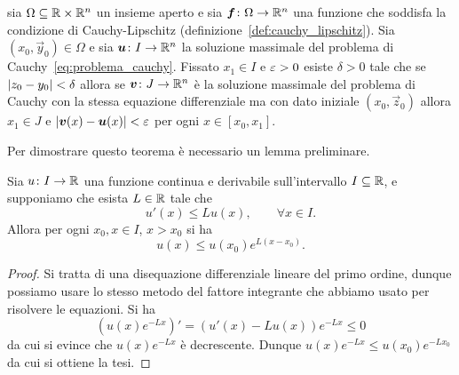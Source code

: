 \begin{theorem}
\label{th:edo_dipendenza_continua}%
sia $\Omega \subseteq {\mathbb R}\times {\mathbb R}^n$ un insieme aperto
e sia $\boldsymbol f\colon \Omega \to {\mathbb R}^n$ una funzione che soddisfa la condizione di Cauchy-Lipschitz
(definizione~\ref{def:cauchy_lipschitz}).
Sia $(x_0,\vec y_0)\in \Omega$ e sia $\boldsymbol u\colon I \to {\mathbb R}^n$ la soluzione 
massimale del problema di Cauchy~\eqref{eq:problema_cauchy}.
Fissato $x_1\in I$ e $\varepsilon>0$ esiste $\delta>0$ tale che se ${\left|z_0-y_0\right|} < \delta$ 
allora se $\boldsymbol v\colon J\to {\mathbb R}^n$ è la soluzione massimale del problema di Cauchy
con la stessa equazione differenziale ma con dato iniziale $(x_0,\vec z_0)$ allora $x_1\in J$ e ${\left|\boldsymbol v(x) - \boldsymbol u(x)\right|} < \varepsilon$ per ogni 
$x\in [x_0,x_1]$.
\end{theorem}
Per dimostrare questo teorema è necessario un lemma preliminare.
\begin{lemma}%
  \label{lm:gronwall_bis}%
  Sia $u\colon I\to {\mathbb R}$ una funzione continua e derivabile sull'intervallo $I\subseteq {\mathbb R}$,
  e supponiamo che esista $L\in {\mathbb R}$ tale che 
  \[
    u'(x) \le L u(x), \qquad \forall x \in I.
  \]
  Allora per ogni $x_0,x\in I$, $x>x_0$ si ha
  \[
    u(x) \le u(x_0) e^{L(x-x_0)}.
  \]
\end{lemma}
\begin{proof}
Si tratta di una disequazione differenziale lineare del primo ordine, 
dunque possiamo usare lo stesso metodo del fattore integrante che abbiamo 
usato per risolvere le equazioni. Si ha 
\[
  (u(x) e^{-Lx})' = (u'(x) - L u(x)) e^{-Lx} \le 0
\]
da cui si evince che $u(x) e^{-Lx}$ è decrescente. Dunque 
$u(x) e^{-Lx} \le u(x_0) e^{-Lx_0}$ da cui si ottiene la tesi.
\end{proof}

